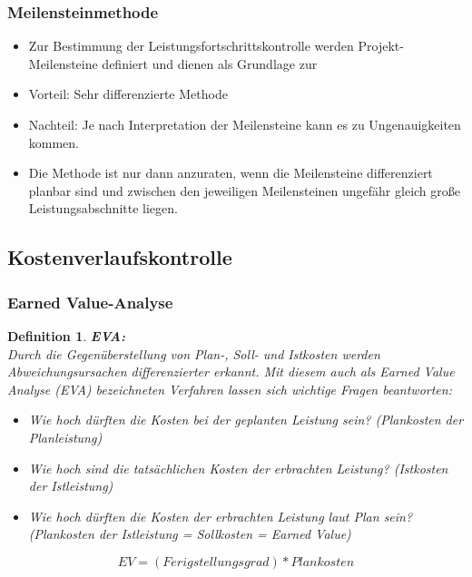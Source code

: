 \documentclass[11pt,a4paper]{article}
\newenvironment{de}[1]
{\begin{mdframed}[style=de]\begin{mydef}{\textbf{#1:}}\\} 
{\end{mydef}\end{mdframed}}
\newtheorem{mydef}{Definition}
\begin{document}
\subsubsection{Meilensteinmethode}

\begin{itemize}
	\item Zur Bestimmung der Leistungsfortschrittskontrolle werden Projekt-
Meilensteine definiert und dienen als Grundlage zur
	\item Vorteil: Sehr differenzierte Methode
	\item Nachteil: Je nach Interpretation der Meilensteine kann es zu Ungenauigkeiten
kommen.
	\item Die Methode ist nur dann anzuraten, wenn die Meilensteine
differenziert planbar sind und zwischen den jeweiligen Meilensteinen
ungefähr gleich große Leistungsabschnitte liegen.
\end{itemize}

\subsection{Kostenverlaufskontrolle}

\subsubsection{Earned Value-Analyse}

\begin{de}{EVA}
Durch die Gegenüberstellung von Plan-, Soll- und Istkosten werden
Abweichungsursachen differenzierter erkannt. Mit diesem auch als Earned
Value Analyse (EVA) bezeichneten Verfahren lassen sich wichtige Fragen
beantworten:

\begin{itemize}
\item Wie hoch dürften die Kosten bei der geplanten Leistung sein?
(Plankosten der Planleistung)
\item Wie hoch sind die tatsächlichen Kosten der erbrachten Leistung?
(Istkosten der Istleistung)
\item Wie hoch dürften die Kosten der erbrachten Leistung laut Plan sein?
(Plankosten der Istleistung = Sollkosten = Earned Value)
\end{itemize}
\end{de}

$$ EV = (Ferigstellungsgrad)*Plankosten$$
\end{document}
